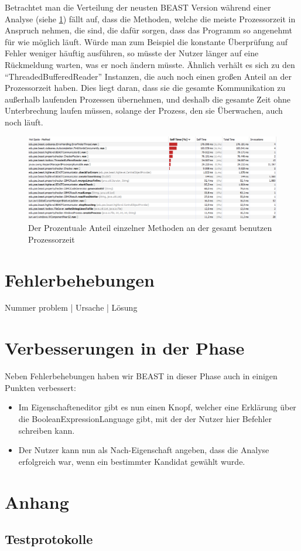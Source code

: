 \documentclass[a4paper]{scrreprt}
\begin{document}
\newpage
Betrachtet man die Verteilung der neusten BEAST Version während einer
Analyse (siehe \ref{fig5}) fällt auf, dass die Methoden, welche die meiste
Prozessorzeit in Anspruch nehmen, die sind, die dafür sorgen, dass das Programm
so angenehmt für wie möglich läuft. Würde man zum Beispiel die konstante
Überprüfung auf Fehler weniger häuftig ausführen, so müsste der Nutzer länger auf eine
Rückmeldung warten, was er noch ändern müsste. Ähnlich verhält es sich zu den
"`ThreadedBufferedReader"' Instanzen, die auch noch einen großen Anteil an der
Prozessorzeit haben. Dies liegt daran, dass sie die gesamte Kommunikation zu
außerhalb laufenden Prozessen übernehmen, und deshalb die gesamte Zeit ohne
Unterbrechung laufen müssen, solange der Prozess, den sie Überwachen, auch noch
läuft.

\begin{figure}[ht]
	\centering
  \includegraphics[width=1.0\textwidth,
  height=0.40\textwidth]{images/BEAST_PROCESSORTIME.png} \caption{Der
  Prozentuale Anteil einzelner Methoden an der gesamt benutzen Prozessorzeit}
	\label{fig5}
\end{figure}

\chapter{Fehlerbehebungen}

Nummer problem | Ursache | Lösung


\chapter{Verbesserungen in der Phase}
Neben Fehlerbehebungen haben wir BEAST in dieser Phase auch in einigen Punkten
verbessert:

\begin{itemize}
  \item Im Eigenschafteneditor gibt es nun einen Knopf, welcher eine Erklärung
  über die BooleanExpressionLanguage gibt, mit der der Nutzer hier Befehler
  schreiben kann.
  \item Der Nutzer kann nun als Nach-Eigenschaft angeben, dass die Analyse
  erfolgreich war, wenn ein bestimmter Kandidat gewählt wurde.
\end{itemize}

\chapter{Anhang}

\section{Testprotokolle}






\end{document}
